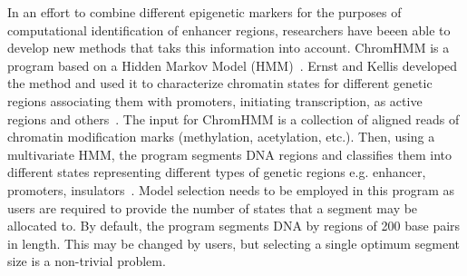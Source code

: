         In an effort to combine different epigenetic markers for the purposes of computational identification of enhancer regions, researchers have beeen able to develop new methods that taks this information into account. ChromHMM is a program based on a Hidden Markov Model (HMM)~\cite{mesa2016hidden}. Ernst and Kellis developed the method and used it to characterize chromatin states for different genetic regions associating them with promoters, initiating transcription, as active regions and others~\cite{ernst2010discovery}. The input for ChromHMM is a collection of aligned reads of chromatin modification marks (methylation, acetylation, etc.). Then, using a multivariate HMM, the program segments DNA regions and classifies them into different states representing different types of genetic regions e.g. enhancer, promoters, insulators~\cite{ernst2012chromhmm}. Model selection needs to be employed in this program as users are required to provide the number of states that a segment may be allocated to. By default, the program segments DNA by regions of 200 base pairs in length. This may be changed by users, but selecting a single optimum segment size is a non-trivial problem. 
        
       
        
        
        
        
        
        

        
        

